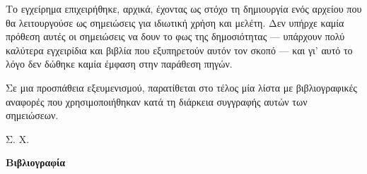     Το εγχείρημα επιχειρήθηκε, αρχικά, έχοντας ως στόχο τη δημιουργία ενός αρχείου που θα λειτουργούσε ως σημειώσεις για ιδιωτική χρήση και μελέτη. Δεν υπήρχε καμία πρόθεση αυτές οι σημειώσεις να δουν το φως της δημοσιότητας --- υπάρχουν πολύ καλύτερα εγχειρίδια και βιβλία που εξυπηρετούν αυτόν τον σκοπό --- και γι' αυτό το λόγο δεν δώθηκε καμία έμφαση στην παράθεση πηγών.
    
    Σε μια προσπάθεια εξευμενισμού, παρατίθεται στο τέλος μία λίστα με βιβλιογραφικές αναφορές που χρησιμοποιήθηκαν κατά τη διάρκεια συγγραφής αυτών των σημειώσεων.

    \begin{flushright}
        Σ. Χ.
    \end{flushright}
    \newpage
    \thispagestyle{empty}
    
    
    


{   \cleardoublepage
    
    

  \hypersetup{linkcolor=black, pdfborder=0 0 1}
  \dominitoc
  \tableofcontents
}


	


    \mainmatter  %

    
    
    
    
    
    


    \appendix
    
    
    
    





\newpage
\thispagestyle{empty}
\begin{flushright}
    \textbf{\LARGE Βιβλιογραφία} 
\end{flushright}

